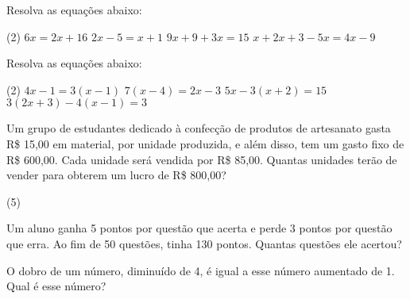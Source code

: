 \documentclass[a4paper,11pt,addpoints]{exam}
\begin{document}
\begin{questions}

	\question[1]

	Resolva as equações abaixo:

	\begin{tasks}(2)
		\task $6x = 2x + 16$
		\task $2x -5 = x + 1$
		\task $9x + 9 + 3x = 15$
		\task $x + 2x + 3 - 5x = 4x - 9$
	\end{tasks}

	\question[1]

	Resolva as equações abaixo:

	\begin{tasks}(2)
		\task $4x - 1 = 3(x - 1)$
		\task $7(x-4) = 2x - 3$
		\task $5x - 3(x + 2) = 15$
		\task $3(2x + 3) - 4(x - 1) = 3$
	\end{tasks}

	\question[1]

	Um grupo de estudantes dedicado à confecção de produtos de artesanato
	gasta R\$ 15,00 em material, por unidade produzida, e além disso, tem um
	gasto fixo de R\$ 600,00. Cada unidade será vendida por R\$ 85,00. Quantas
	unidades terão de vender para obterem um lucro de R\$ 800,00?

	\begin{tasks}(5)
	\end{tasks}

	\question[1]

	Um aluno ganha 5 pontos por questão que acerta e perde 3 pontos por
	questão que erra. Ao fim de 50 questões, tinha 130 pontos. Quantas
	questões ele acertou?

	\question[1]

	O dobro de um número, diminuído de 4, é igual a esse número aumentado de 1.
	Qual é esse número?


\end{questions}
\end{document}
